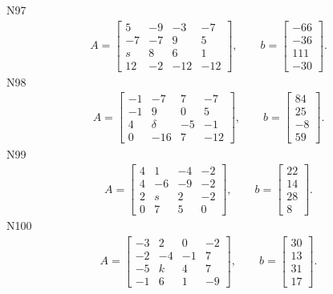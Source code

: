 \documentclass[11pt]{report}
\begin{document}
N97
\begin{align*}
 A = \left[\begin{matrix}5 & -9 & -3 & -7\\-7 & -7 & 9 & 5\\s & 8 & 6 & 1\\12 & -2 & -12 & -12\end{matrix}\right],
\qquad b = \left[\begin{matrix}-66\\-36\\111\\-30\end{matrix}\right]. 
 \end{align*}
N98
\begin{align*}
 A = \left[\begin{matrix}-1 & -7 & 7 & -7\\-1 & 9 & 0 & 5\\4 & \delta & -5 & -1\\0 & -16 & 7 & -12\end{matrix}\right],
\qquad b = \left[\begin{matrix}84\\25\\-8\\59\end{matrix}\right]. 
 \end{align*}
N99
\begin{align*}
 A = \left[\begin{matrix}4 & 1 & -4 & -2\\4 & -6 & -9 & -2\\2 & s & 2 & -2\\0 & 7 & 5 & 0\end{matrix}\right],
\qquad b = \left[\begin{matrix}22\\14\\28\\8\end{matrix}\right]. 
 \end{align*}
N100
\begin{align*}
 A = \left[\begin{matrix}-3 & 2 & 0 & -2\\-2 & -4 & -1 & 7\\-5 & k & 4 & 7\\-1 & 6 & 1 & -9\end{matrix}\right],
\qquad b = \left[\begin{matrix}30\\13\\31\\17\end{matrix}\right]. 
 \end{align*}
\end{document}
